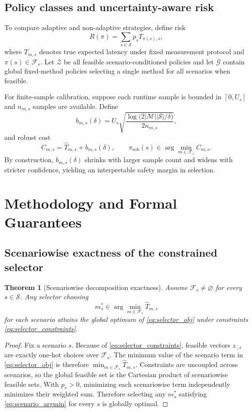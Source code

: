 \documentclass{article} %
\newtheorem{theorem}{Theorem}[section]
\begin{document}
\subsection{Policy classes and uncertainty-aware risk}
To compare adaptive and non-adaptive strategies, define risk
\begin{equation}
R(\pi)=\sum_{s\in\mathcal{S}} p_s T_{\pi(s),s},
\label{eq:risk_def}
\end{equation}
where $T_{m,s}$ denotes true expected latency under fixed measurement protocol and $\pi(s)\in\mathcal{F}_s$. Let $\mathcal{Z}$ be all feasible scenario-conditioned policies and let $\mathcal{G}$ contain global fixed-method policies selecting a single method for all scenarios when feasible.

For finite-sample calibration, suppose each runtime sample is bounded in $[0,U_s]$ and $n_{m,s}$ samples are available. Define
\begin{equation}
b_{m,s}(\delta)=U_s\sqrt{\frac{\log\!\big(2|\mathcal{M}||\mathcal{S}|/\delta\big)}{2n_{m,s}}},
\label{eq:hoeffding_radius}
\end{equation}
and robust cost
\begin{equation}
C_{m,s}=\widehat{T}_{m,s}+b_{m,s}(\delta),\qquad
\pi_{\mathrm{rob}}(s)\in\arg\min_{m\in\mathcal{F}_s} C_{m,s}.
\label{eq:robust_selector}
\end{equation}
By construction, $b_{m,s}(\delta)$ shrinks with larger sample count and widens with stricter confidence, yielding an interpretable safety margin in selection.

\section{Methodology and Formal Guarantees}
\subsection{Scenariowise exactness of the constrained selector}
\begin{theorem}[Scenariowise decomposition exactness]
\label{thm:decompose}
Assume $\mathcal{F}_s\neq\varnothing$ for every $s\in\mathcal{S}$. Any selector choosing
\begin{equation}
m_s^*\in\arg\min_{m\in\mathcal{F}_s}\widehat{T}_{m,s}
\label{eq:scenario_argmin}
\end{equation}
for each scenario attains the global optimum of \eqref{eq:selector_obj} under constraints \eqref{eq:selector_constraints}.
\end{theorem}
\begin{proof}
Fix a scenario $s$. Because of \eqref{eq:selector_constraints}, feasible vectors $z_{\cdot,s}$ are exactly one-hot choices over $\mathcal{F}_s$. The minimum value of the scenario term in \eqref{eq:selector_obj} is therefore $\min_{m\in\mathcal{F}_s}\widehat{T}_{m,s}$. Constraints are uncoupled across scenarios, so the global feasible set is the Cartesian product of scenariowise feasible sets. With $p_s>0$, minimizing each scenariowise term independently minimizes their weighted sum. Therefore selecting any $m_s^*$ satisfying \eqref{eq:scenario_argmin} for every $s$ is globally optimal.
\end{proof}
\end{document}
